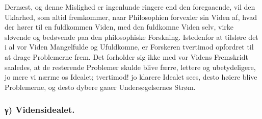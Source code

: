 \documentclass[11pt]{book}
\newcommand{\opage}[1]{\marginnote{\footnotesize\textit{[#1]}}}
\begin{document}
Dernæst, og denne Mislighed er ingenlunde ringere end den foregaaende,
vil den Uklarhed, som altid fremkommer, naar Philosophien forvexler sin
Viden af, hvad
\opage{253} \setcounter{footnote}{0}%
der hører til en fuldkommen Viden, med den fuldkomne Viden selv, virke
sløvende og bedøvende paa den philosophiske Forskning. Istedenfor at
tilsløre det i al vor Viden Mangelfulde og Ufuldkomne, er Forskeren
tvertimod opfordret til at drage Problemerne frem. Det forholder sig
ikke med vor Videns Fremskridt saaledes, at de resterende Problemer
skulde blive færre, lettere og ubetydeligere, jo mere vi nærme os
Idealet; tvertimod! jo klarere Idealet sees, desto høiere blive
Problemerne, og desto dybere gaaer Undersøgelsernes Strøm.

\subsubsection*{γ) Vidensidealet.}
\end{document}
